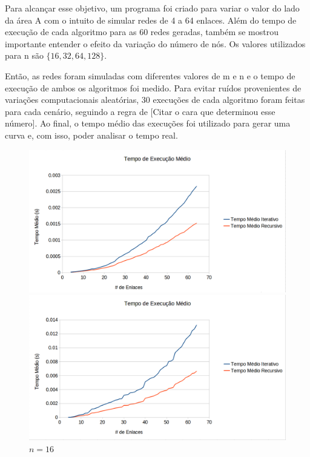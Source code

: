 Para alcançar esse objetivo, um programa foi criado para variar o valor do lado da área A com o intuito de simular redes de 4 a 64 enlaces. Além do tempo de execução de cada algoritmo para as 60 redes geradas, também se mostrou importante entender o efeito da variação do número de nós. Os valores utilizados para n são $\{16, 32, 64, 128\}$. 

Então, as redes foram simuladas com diferentes valores de m e n e o tempo de execução de ambos os algoritmos foi medido. Para evitar ruídos provenientes de variações computacionais aleatórias, 30 execuções de cada algoritmo foram feitas para cada cenário, seguindo a regra de [Citar o cara que determinou esse número]. Ao final, o tempo médio das execuções foi utilizado para gerar uma curva e, com isso, poder analisar o tempo real.

\begin{figure}[ht] 
  \label{fig:tempo} 
  \begin{minipage}[b]{0.5\linewidth}
    \centering
    \includegraphics[width=1\linewidth]{figs/tempo16.png} 
    \caption{$n=16$} 
    \vspace{4ex}
  \end{minipage}%
  \begin{minipage}[b]{0.5\linewidth}
    \centering
    \includegraphics[width=1\linewidth]{figs/tempo32.png} 

\end{minipage}
\end{figure}
